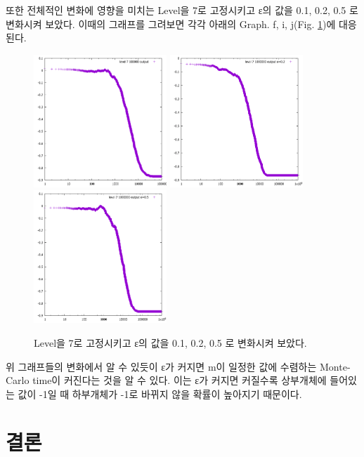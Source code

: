 \documentclass{gshs-report-v1.2}
\begin{document}
또한 전체적인 변화에 영향을 미치는 Level을 7로 고정시키고 ε의 값을 0.1, 0.2, 0.5 로 변화시켜 보았다. 이때의 그래프를 그려보면 각각 아래의 Graph. f, i, j(Fig. \ref{Fig06})에 대응된다.

\begin{figure}[h]
	\begin{center}
		\includegraphics[width=5cm]{(f).png}
		\includegraphics[width=5cm]{(i).png}
		\includegraphics[width=5cm]{(j).png}\\
		\caption{Level을 7로 고정시키고 ε의 값을 0.1, 0.2, 0.5 로 변화시켜 보았다.} 
		\label{Fig06}
	\end{center}
\end{figure}

위 그래프들의 변화에서 알 수 있듯이 ε가 커지면 m이 일정한 값에 수렴하는 Monte-Carlo time이 커진다는 것을 알 수 있다. 이는 ε가 커지면 커질수록 상부개체에 들어있는 값이 -1일 때 하부개체가 -1로 바뀌지 않을 확률이 높아지기 때문이다. 

\section{결론}
\end{document}
